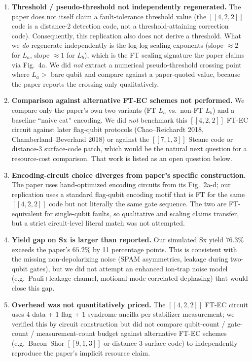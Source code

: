 \documentclass[11pt]{article}
\begin{document}
\begin{enumerate}
\item \textbf{Threshold / pseudo-threshold not independently regenerated.}
The paper does not itself claim a fault-tolerance threshold value (the
$[\![4,2,2]\!]$ code is a distance-2 detection code, not a threshold-attaining
correction code). Consequently, this replication also does not derive a
threshold. What we \emph{do} regenerate independently is the log-log
scaling exponents (slope $\approx 2$ for $L_a$, slope $\approx 1$ for $L_b$),
which is the FT scaling signature the paper claims via Fig.~4a. We did
\emph{not} extract a numerical pseudo-threshold crossing point where
$L_a > $ bare qubit and compare against a paper-quoted value, because the
paper reports the crossing only qualitatively.

\item \textbf{Comparison against alternative FT-EC schemes not performed.}
We compare only the paper's own two variants (FT $L_a$ vs.\ non-FT $L_b$)
and a baseline ``naive cat'' encoding. We did \emph{not} benchmark this
$[\![4,2,2]\!]$ FT-EC circuit against later flag-qubit protocols
(Chao--Reichardt 2018, Chamberland--Beverland 2018) or against the
$[\![7,1,3]\!]$ Steane code or distance-3 surface-code patch, which would
be the natural next question for a resource-cost comparison. That work is
listed as an open question below.

\item \textbf{Encoding-circuit choice diverges from paper's specific
construction.} The paper uses hand-optimized encoding circuits from its
Fig.~2a-d; our replication uses a standard flag-qubit encoding motif that
is FT for the same $[\![4,2,2]\!]$ code but not literally the same
gate sequence. The two are FT-equivalent for single-qubit faults, so
qualitative and scaling claims transfer, but a strict circuit-level
literal match was not attempted.

\item \textbf{Yield gap on Sx is larger than reported.} Our simulated
Sx yield $76.3\%$ exceeds the paper's $65.2\%$ by 11 percentage points.
This is consistent with the missing non-depolarizing noise (SPAM
asymmetries, leakage during two-qubit gates), but we did not attempt an
enhanced ion-trap noise model (e.g.\ Pauli+leakage channel, motional-mode
correlated dephasing) that would close this gap.

\item \textbf{Overhead was not quantitatively priced.} The $[\![4,2,2]\!]$
FT-EC circuit uses 4 data + 1 flag + 1 syndrome ancilla per stabilizer
measurement; we verified this by circuit construction but did not compare
qubit-count / gate-count / measurement-count budget against alternative
FT-EC schemes (e.g.\ Bacon--Shor $[\![9,1,3]\!]$ or distance-3 surface
code) to independently reproduce the paper's implicit resource claim.


\end{enumerate}
\end{document}
